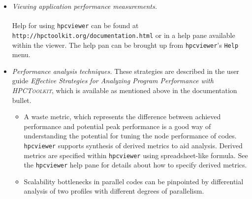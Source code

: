 \documentclass[10pt]{article}
\newcommand{\HPCToolkit}{\textsc{HPCToolkit}}
\begin{document}
\begin{itemize}
\item{ \em Viewing application performance measurements.}\\
\\[1ex]
Help for using {\tt hpcviewer} can be found at  {\tt http://hpctoolkit.org/documentation.html}  or in a help pane available within the viewer. The help pan can be brought up from {\tt hpcviewer}'s {\tt Help} menu.

\item{ \em Performance analysis techniques.}
These strategies are described in the user guide {\em Effective Strategies for Analyzing Program Performance with \HPCToolkit{}}, which is available as mentioned above in the documentation bullet.

\begin{itemize}
\item
A waste metric, which represents the difference between achieved performance and potential peak performance is a good way of understanding the potential for tuning the node performance of codes. {\tt hpcviewer} supports synthesis of derived metrics to aid analysis. Derived metrics are specified within {\tt hpcviewer} using spreadsheet-like formula. See the {\tt hpcviewer} help pane for details about how to specify derived metrics.
\item
Scalability bottlenecks in parallel codes can be pinpointed by differential analysis of two profiles with different degrees of parallelism. 
\end{itemize}
\end{itemize}



% 
% 
% 
\end{document}
